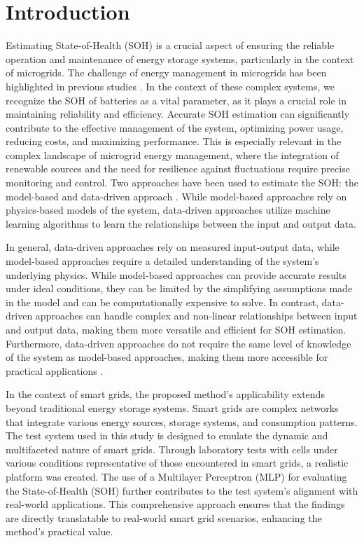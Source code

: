 \documentclass[energies,article,accept,pdftex,moreauthors]{Definitions/mdpi}
\begin{document}
\section{Introduction}

Estimating State-of-Health (SOH) is a crucial aspect of ensuring the reliable operation and maintenance of energy storage systems, particularly in the context of microgrids. The challenge of energy management in microgrids has been highlighted in previous studies \cite{Sahri.2021, Soliman.2021}. In the context of these complex systems, we recognize the SOH of batteries as a vital parameter, as it plays a crucial role in maintaining reliability and efficiency. Accurate SOH estimation can significantly contribute to the effective management of the system, optimizing power usage, reducing costs, and maximizing performance. This is especially relevant in the complex landscape of microgrid energy management, where the integration of renewable sources and the need for resilience against fluctuations require precise monitoring and control. Two approaches have been used to estimate the SOH: the model-based and data-driven approach \cite{Gou.2020}. While model-based approaches rely on physics-based models of the system, data-driven approaches utilize machine learning algorithms to learn the relationships between the input and output data. %

In general, data-driven approaches rely on measured input-output data, while model-based approaches require a detailed understanding of the system's underlying physics. While model-based approaches can provide accurate results under ideal conditions, they can be limited by the simplifying assumptions made in the model and can be computationally expensive to solve. In contrast, data-driven approaches can handle complex and non-linear relationships between input and output data, making them more versatile and efficient for SOH estimation. Furthermore, data-driven approaches do not require the same level of knowledge of the system as model-based approaches, making them more accessible for practical applications \cite{Oji.2021}.

In the context of smart grids, the proposed method's applicability extends beyond traditional energy storage systems. Smart grids are complex networks that integrate various energy sources, storage systems, and consumption patterns. The test system used in this study is designed to emulate the dynamic and multifaceted nature of smart grids. Through laboratory tests with cells under various conditions representative of those encountered in smart grids, a realistic platform was created. The use of a Multilayer Perceptron (MLP) for evaluating the State-of-Health (SOH) further contributes to the test system's alignment with real-world applications. This comprehensive approach ensures that the findings are directly translatable to real-world smart grid scenarios, enhancing the method's practical value. %
\end{document}
